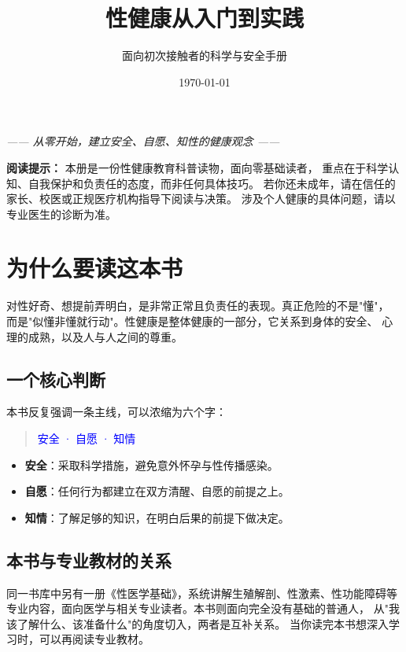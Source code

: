 \documentclass[12pt,UTF8,openany]{ctexbook}
\title{\myhei\zihao{0} 性健康从入门到实践}
\author{面向初次接触者的科学与安全手册}
\date{\today}
\newcommand{\myhei}{\CJKfamily{hei}}
\begin{document}
\maketitle

\begin{center}
\itshape{}
—— 从零开始，建立安全、自愿、知性的健康观念 ——
\end{center}

\vspace{1em}

\noindent\textbf{阅读提示：} 本册是一份性健康教育科普读物，面向零基础读者，
重点在于科学认知、自我保护和负责任的态度，而非任何具体技巧。
若你还未成年，请在信任的家长、校医或正规医疗机构指导下阅读与决策。
涉及个人健康的具体问题，请以专业医生的诊断为准。

\tableofcontents

\chapter{为什么要读这本书}

对性好奇、想提前弄明白，是非常正常且负责任的表现。真正危险的不是"懂"，
而是"似懂非懂就行动"。性健康是整体健康的一部分，它关系到身体的安全、
心理的成熟，以及人与人之间的尊重。

\section{一个核心判断}

本书反复强调一条主线，可以浓缩为六个字：

\begin{quote}
\centering \myhei{}\textcolor{blue}{安全 · 自愿 · 知情}
\end{quote}

\begin{itemize}
  \item \textbf{安全}：采取科学措施，避免意外怀孕与性传播感染。
  \item \textbf{自愿}：任何行为都建立在双方清醒、自愿的前提之上。
  \item \textbf{知情}：了解足够的知识，在明白后果的前提下做决定。
\end{itemize}

\section{本书与专业教材的关系}

同一书库中另有一册《性医学基础》，系统讲解生殖解剖、性激素、性功能障碍等
专业内容，面向医学与相关专业读者。本书则面向完全没有基础的普通人，
从"我该了解什么、该准备什么"的角度切入，两者是互补关系。
当你读完本书想深入学习时，可以再阅读专业教材。
\end{document}
